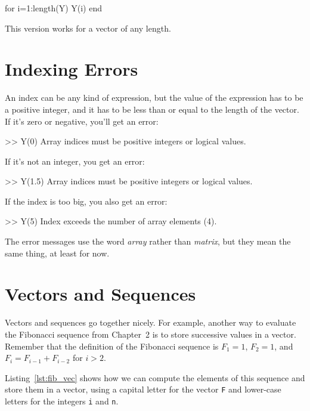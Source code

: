 \begin{code}
for i=1:length(Y)
     Y(i)
end
\end{code}

This version works for a vector of any length.


\section{Indexing Errors}


An index can be any kind of expression, but the value of the
expression has to be a positive integer, and it has to be
less than or equal to the length of the vector.  If it's
zero or negative, you'll get an error:

\begin{code}
>> Y(0)
Array indices must be positive integers or logical values.
\end{code}

If it's not an integer, you get an error:

\begin{code}
>> Y(1.5)
Array indices must be positive integers or logical values.
\end{code}

If the index is too big, you also get an error:

\begin{code}
>> Y(5)
Index exceeds the number of array elements (4).
\end{code}

The error messages use the word \emph{array} rather than \emph{matrix}, but they mean the same thing, at least for now.


\section{Vectors and Sequences}
\label{vecseq}


Vectors and sequences go together nicely.
For example, another way to evaluate the Fibonacci sequence from Chapter~2 is to
store successive values in a vector.  Remember that the definition of the
Fibonacci sequence is $F_1 = 1$, $F_2 = 1$, and
$F_{i} = F_{i-1} + F_{i-2}$ for $i > 2$.

Listing~\ref{lst:fib_vec} shows how we can compute the elements of this sequence and store them in a vector, using a capital letter for the vector \lstinline{F}
and lower-case letters for the integers \lstinline{i} and \lstinline{n}.

